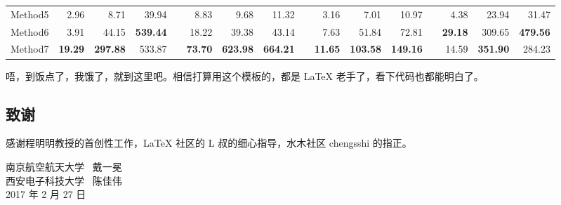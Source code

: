 \documentclass[a4paper,zihao=-4]{article}
\begin{document}
\begin{CJK*}{UTF8}{gbsn}
\begin{table}[htb!]
\begin{tabular}{lrrrrrrrrrrrrrrr}
		Method5 & 2.96                        & 8.71                        & 39.94                       &           & 8.83                        & 9.68                        & 11.32                       &           & 3.16                        & 7.01                        & 10.97                       &           & 4.38                        & 23.94                       & 31.47                       \\
		Method6 & 3.91                        & 44.15                       & \textbf{539.44}             & \textbf{} & 18.22                       & 39.38                       & 43.14                       &           & 7.63                        & 51.84                       & 72.81                       &           & \textbf{29.18}              & 309.65                      & \textbf{479.56}             \\
		Method7 & \textbf{19.29}              & \textbf{297.88}             & 533.87                      &           & \textbf{73.70}              & \textbf{623.98}             & \textbf{664.21}             & \textbf{} & \textbf{11.65}              & \textbf{103.58}             & \textbf{149.16}             & \textbf{} & 14.59                       & \textbf{351.90}             & 284.23                      \\
		\bottomrule
	\end{tabular}%
	\label{tab:Quantitative}%
\end{table}%

唔，到饭点了，我饿了，就到这里吧。相信打算用这个模板的，都是 LaTeX 老手了，看下代码也都能明白了。

\subsection*{致谢}
感谢程明明教授的首创性工作，LaTeX 社区的 L 叔的细心指导，水木社区 chengsshi 的指正。

{
	\raggedleft 
	南京航空航天大学~ 戴一冕\\
	西安电子科技大学~ 陈佳伟\\
	2017 年 2 月 27 日\\
}





\end{CJK*}
\end{document}

